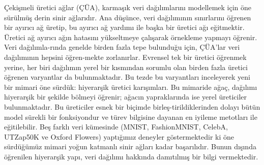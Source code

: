 \documentclass[a4paper,onesided,12pt]{report}
\begin{document}
\begin{ozet}
Çekişmeli üretici ağlar (ÇÜA), karmaşık veri dağılımlarını modellemek için öne sürülmüş derin sinir ağlarıdır. Ana düşünce, veri dağılımının sınırlarını öğrenen bir ayırıcı ağ üretip, bu ayırıcı ağ yardımı ile başka bir üretici ağı eğitmektir. Üretici ağ ayırıcı ağın hatasını yükseltmeye çalışarak örnekleme yapmayı öğrenir. Veri dağılımla-rında genelde birden fazla tepe bulunduğu için, ÇÜA'lar veri dağılımının hepsini öğren-mekte zorlanırlar. Evrensel tek bir üretici öğrenmek yerine, her biri dağılımın yerel bir kısmından sorumlu olan birden fazla üretici öğrenen varyantlar da bulunmaktadır. Bu tezde bu varyantları inceleyerek yeni bir mimari öne sürdük: hiyerarşik üretici karışımları. Bu mimaride ağaç, dağılımı hiyerarşik bir şekilde bölmeyi öğrenir; ağacın yapraklarında ise yerel üreticiler bulunmaktadır. Bu üreticiler esnek bir biçimde birleş-tirildiklerinden dolayı bütün model sürekli bir fonksiyondur ve türev bilgisine dayanan en iyileme metotları ile eğitilebilir. Beş farklı veri kümesinde (MNIST, FashionMNIST, CelebA, UTZap50K ve Oxford Flowers) yaptığımız deneyler göstermektedir ki öne sürdüğümüz mimari yoğun katmanlı sinir ağları kadar başarılıdır. Bunun dışında öğrenilen hiyerarşik yapı, veri dağılımı hakkında damıtılmış bir bilgi vermektedir.

\end{ozet}
\tableofcontents
\listoffigures
\listoftables
\begin{symbols}

\end{symbols}
\end{document}
